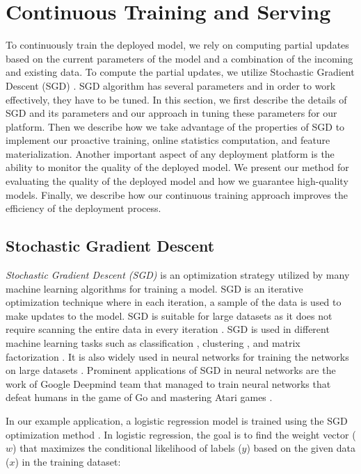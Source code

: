 \section{Continuous Training and Serving} \label{continuous-training-serving}
To continuously train the deployed model, we rely on computing partial updates based on the current parameters of the model and a combination of the incoming and existing data.
To compute the partial updates, we utilize Stochastic Gradient Descent (SGD) \cite{zhang2004solving}.
SGD algorithm has several parameters and in order to work effectively, they have to be tuned.
In this section, we first describe the details of SGD and its parameters and our approach in tuning these parameters for our platform.
Then we describe how we take advantage of the properties of SGD to implement our proactive training, online statistics computation, and feature materialization.
Another important aspect of any deployment platform is the ability to monitor the quality of the deployed model.
We present our method for evaluating the quality of the deployed model and how we guarantee high-quality models.
Finally, we describe how our continuous training approach improves the efficiency of the deployment process.

\subsection{Stochastic Gradient Descent} \label{sgd}
\textit{Stochastic Gradient Descent (SGD)} is an optimization strategy utilized by many machine learning algorithms for training a model.
SGD is an iterative optimization technique where in each iteration, a sample of the data is used to make updates to the model.
SGD is suitable for large datasets as it does not require scanning the entire data in every iteration \cite{bottou2010large}.
SGD is used in different machine learning tasks such as classification \cite{zhang2004solving, macmahan2013}, clustering \cite{bottou1995convergence}, and matrix factorization \cite{koren2009matrix,  funk2006netflix}.
It is also widely used in neural networks for training the networks on large datasets \cite{dean2012large}.
Prominent applications of SGD in neural networks are the work of Google Deepmind team that managed to train neural networks that defeat humans in the game of Go \cite{silver2016mastering} and mastering Atari games \cite{mnih2013playing}.

In our example application, a logistic regression model is trained using the SGD optimization method \cite{macmahan2013}.
In logistic regression, the goal is to find the weight vector ($w$) that maximizes the conditional likelihood of labels ($y$) based on the given data ($x$) in the training dataset:

